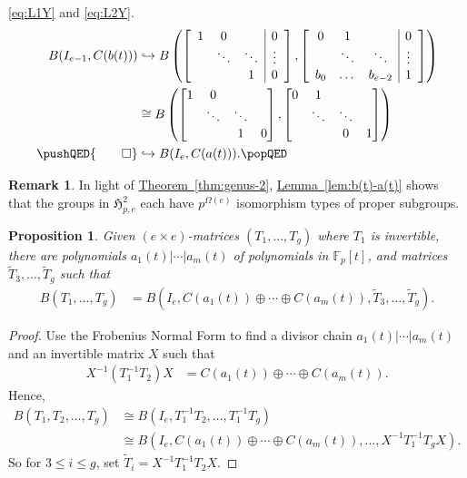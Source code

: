 \documentclass[11pt]{article}
\numberwithin{equation}{section}
\theoremstyle{definition}
\newtheorem{remark}[theorem]{Remark}
\theoremstyle{plain}
\newcommand{\expref}[2]{\hyperref[#2]{#1~\ref{#2}}}
\numberwithin{equation}{section}
\theoremstyle{plain}       %
\newtheorem{prop}[equation]{Proposition}
\theoremstyle{remark}
\theoremstyle{definition}
\numberwithin{figure}{section}
\numberwithin{table}{section}
\newcommand{\mygroups}{\mathfrak{H}}
\newcommand{\bbF}{\mathbb{F}}  %
\begin{document}
\eqref{eq:L1Y} and \eqref{eq:L2Y}.
\begin{align*}
	B(I_{e-1}, C(b(t))) & \hookrightarrow
	 B\left(\left[\begin{array}{ccc|c} 1 & 0 & & 0 \\ & \ddots & \ddots &\vdots \\ & & 1& 0\end{array}\right],
	\left[\begin{array}{ccc|c} 0 & 1 & & 0 \\ & \ddots & \ddots & \vdots\\ b_0 &\dots & b_{e-2} & 1\end{array}\right]\right)\\
	&\cong B\left(\begin{bmatrix} 1 & 0 & & \\ & \ddots & \ddots \\ & & 1 & 0 \end{bmatrix},
	\begin{bmatrix} 0 & 1 & & \\ & \ddots & \ddots \\ & & 0 & 1 \end{bmatrix}\right)\\
	\pushQED{\qed} 
	& \hookrightarrow B(I_e, C(a(t))).\qedhere
	\popQED
\end{align*}
%

\begin{remark}
In light of \expref{Theorem}{thm:genus-2}, \expref{Lemma}{lem:b(t)-a(t)} shows that the
groups in $\mygroups_{p,e}^{2}$ each have  $p^{\Omega(e)}$ isomorphism types of
proper subgroups.
\end{remark}

\begin{prop}\label{prop:pairs}
	Given $(e\times e)$-matrices $(T_1,\dots,T_g)$ where $T_1$ is invertible,
	there are polynomials $a_1(t)|\cdots |a_m(t)$ of polynomials in $\bbF_p[t]$,
	and matrices $\tilde{T}_3,\dots,\tilde{T}_g$ such that
\begin{align*}
	B(T_1,\ldots,T_g) & = B(I_e, C(a_1(t))\oplus \cdots \oplus C(a_m(t)), 
		\tilde{T}_3,\dots,\tilde{T}_g).
\end{align*}
\end{prop}
\begin{proof}
Use the Frobenius Normal Form \cite[p. 93]{JacII} to find a divisor chain
$a_1(t)|\cdots |a_m(t)$ and an invertible matrix $X$ such that 
\begin{align*}
	X^{-1}(T_1^{-1}T_2)X& = C(a_1(t))\oplus \cdots \oplus C(a_m(t)).
\end{align*}
Hence,
\begin{align*}
	B(T_1,T_2,\dots,T_g) & \cong 
		B(I_e,T_1^{-1}T_2,\dots,T_1^{-1}T_g) \\
		& \cong B(I_e,C(a_1(t))\oplus \cdots \oplus C(a_m(t)),\dots, 
			X^{-1}T_1^{-1}T_g X).
\end{align*}
So for $3\leq i\leq g$, set $\tilde{T}_i=X^{-1} T_1^{-1}T_2 X$.
\end{proof}
\end{document}

